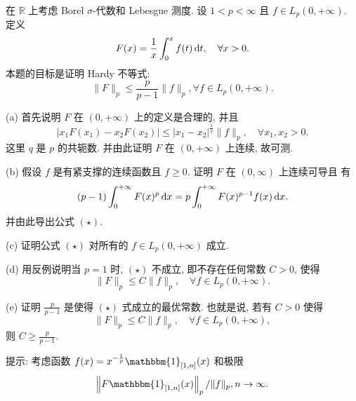 \begin{exercise}
    在 $\mathbb{R}$ 上考虑 Borel $\sigma$-代数和 Lebesgue 测度. 设 $1<p<\infty$ 且 $f \in L_{p}(0,+\infty)$. 定义
    \[
    F(x)=\frac{1}{x} \int_{0}^{x} f(t) \mathop{}\!\mathrm{d} t, \quad \forall x>0.
    \]
    本题的目标是证明 Hardy 不等式:
    \begin{equation}
    \|F\|_{p} \leq \frac{p}{p-1}\|f\|_{p}, \forall f \in L_{p}(0,+\infty). \tag{$\star$}
    \end{equation}

    (a) 首先说明 $F$ 在 $(0,+\infty)$ 上的定义是合理的, 并且
    \[
    |x_1 F(x_1)-x_2 F(x_2)| \leq|x_1-x_2|^{\frac{1}{q}}\|f\|_{p}, \quad \forall x_{1}, x_{2}>0.
    \]
    这里 $q$ 是 $p$ 的共轭数. 并由此证明 $F$ 在 $(0,+\infty)$ 上连续, 故可测.

    (b) 假设 $f$ 是有紧支撑的连续函数且 $f \geq 0$. 证明 $F$ 在 $(0, \infty)$ 上连续可导且 有
    \[
    (p-1)\int_{0}^{+\infty} F(x)^{p}\mathop{}\!\mathrm{d} x = p\int_{0}^{+\infty} F(x)^{p-1}f(x)\mathop{}\!\mathrm{d} x.
    \]
    并由此导出公式 $(\star)$.

    (c) 证明公式 $(\star)$ 对所有的 $f \in L_{p}(0,+\infty)$ 成立.

    (d) 用反例说明当 $p=1$ 时, $(\star)$ 不成立, 即不存在任何常数 $C>0$, 使得
    \[
    \|F\|_{p} \leq C\|f\|_{p}, \quad \forall f \in L_{p}(0,+\infty).
    \]

    (e) 证明 $\frac{p}{p-1}$ 是使得 $(\star)$ 式成立的最优常数. 也就是说, 若有 $C>0$ 使得
    \[
    \|F\|_{p} \leq C\|f\|_{p}, \quad \forall f \in L_{p}(0,+\infty),
    \]
    则 $C\geq\frac{p}{p-1}$.

    提示: 考虑函数 $f(x)=x^{-\frac{1}{p}} \mathbbm{1}_{[1, n]}(x)$ 和极限
    \[
    \left\|F \mathbbm{1}_{[1, n]}(x)\right\|_{p} /\|f\|_{p}, n \rightarrow \infty.
    \]
\end{exercise}

